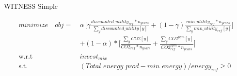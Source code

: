 \documentclass{article}
\begin{document}
WITNESS Simple

\begin{equation}
\begin{aligned}
minimize \quad  obj =~
& \alpha\,\Bigg[\gamma \frac{discounted\_utility_{ref}*n_{years}}{\sum_{y}discounted\_utility[y]}
+ (1 - \gamma) \frac{min\_utility_{ref}*n_{years}}{\sum_{y}min\_utility_{ref}[y]} \Bigg] \\
& +(1-\alpha)*\Bigg[\frac{\sum_{y}CO2[y]}{CO2_{ref}*n_{years}} + \frac{\sum_{y}CO2^{ppm}[y]}{CO2^{ppm}_{ref}*n_{years}} \Bigg]
\\
\textrm{w.r.t} \quad & invest_{mix} \\
\textrm{s.t.} \quad & (Total\_energy\_prod - min\_energy)/energy_{ref} \geq 0\\
\\
\end{aligned}
\end{equation}\\
\end{document}
